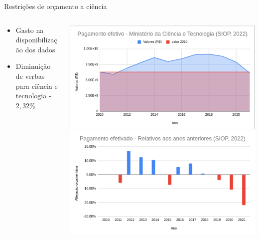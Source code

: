 \documentclass[10pt,brazil]{beamer}
\theoremstyle{definition}
\begin{document}
\begin{frame}{Restrições de orçamento a ciência}
  \begin{columns}
    \begin{column}{0.5\textwidth}
              \begin{itemize}
                \item Gasto na disponibilização dos dados
                \item Diminuição de verbas para ciência e tecnologia -$2,32\%$
      \end{itemize}
    \end{column}
    \begin{column}{0.5\textwidth}  %
      \begin{center}
        \includegraphics[width=1\textwidth]{orcamento.png}
        \includegraphics[width=1\textwidth]{variacaoorcamentaria.png}
      \end{center}
    \end{column}
  \end{columns}
\end{frame}
\end{document}
